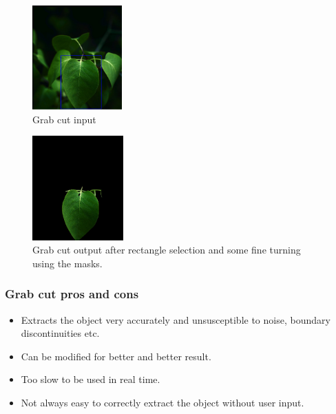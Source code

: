 \documentclass[a4paper]{article}
\begin{document}
\begin{multicols}{2}
\begin{figure}[H]
    \centering
    \includegraphics[height=4cm]{img/grabcut/grabcut_input.PNG}
    \caption{Grab cut input}
\end{figure}
\columnbreak
\begin{figure}[H]
    \centering
    \includegraphics[height=4cm]{img/grabcut/grabcut_output.PNG}
    \caption{Grab cut output after rectangle selection and some fine turning using the masks.}
\end{figure}
\end{multicols}




\subsubsection{Grab cut pros and cons}

\begin{multicols}{2}
    \begin{itemize}
        \item[\textcolor{DarkPink}{\ding{51}}] Extracts the object very accurately and unsusceptible to noise, boundary discontinuities etc.
        \item[\textcolor{DarkPink}{\ding{51}}] Can be modified for better and better result.
    \end{itemize}
    
    \columnbreak
    \begin{itemize}
        \item[\textcolor{DarkPink}{\ding{55}}] Too slow to be used in real time.
        \item[\textcolor{DarkPink}{\ding{55}}] Not always easy to correctly extract the object without user input.
        
    \end{itemize}
\end{multicols}
\end{document}
